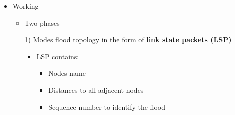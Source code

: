 \begin{itemize}
\begin{itemize}
        \item Working
            \begin{itemize}
                \item Two phases
                \item[1)] Modes flood topology in the form of \textbf{link state packets (LSP)}
                    \begin{itemize}
                        \item LSP contains:
                            \begin{itemize}
                                \item Nodes name
                                \item Distances to all adjacent nodes
                                \item Sequence number to identify the flood
                            \end{itemize}


\end{itemize}
\end{itemize}
\end{itemize}
\end{itemize}
